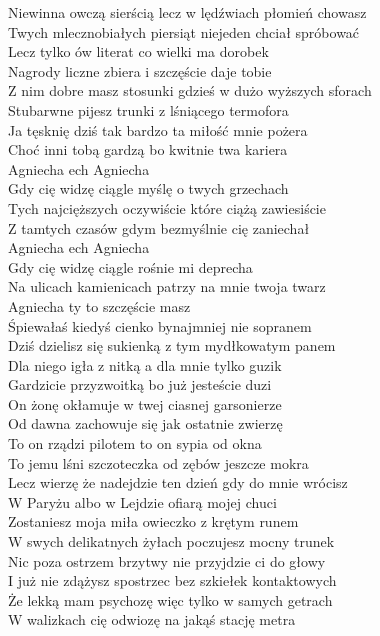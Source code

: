 \begin{text}

    Niewinna owczą sierścią lecz w lędźwiach płomień chowasz\\
    Twych mlecznobiałych piersiąt niejeden chciał spróbować\\
    Lecz tylko ów literat co wielki ma dorobek\\
    Nagrody liczne zbiera i szczęście daje tobie\\
    Z nim dobre masz stosunki gdzieś w dużo wyższych sforach\\
    Stubarwne pijesz trunki z lśniącego termofora\\
    Ja tęsknię dziś tak bardzo ta miłość mnie pożera\\
    Choć inni tobą gardzą bo kwitnie twa kariera\\
    Agniecha ech Agniecha\\
    Gdy cię widzę ciągle myślę o twych grzechach\\
    Tych najcięższych oczywiście które ciążą zawiesiście\\
    Z tamtych czasów gdym bezmyślnie cię zaniechał\\
    Agniecha ech Agniecha\\
    Gdy cię widzę ciągle rośnie mi deprecha\\
    Na ulicach kamienicach patrzy na mnie twoja twarz\\
    Agniecha ty to szczęście masz\\
    Śpiewałaś kiedyś cienko bynajmniej nie sopranem\\
    Dziś dzielisz się sukienką z tym mydłkowatym panem\\
    Dla niego igła z nitką a dla mnie tylko guzik\\
    Gardzicie przyzwoitką bo już jesteście duzi\\
    On żonę okłamuje w twej ciasnej garsonierze\\
    Od dawna zachowuje się jak ostatnie zwierzę\\
    To on rządzi pilotem to on sypia od okna\\
    To jemu lśni szczoteczka od zębów jeszcze mokra\\
    Lecz wierzę że nadejdzie ten dzień gdy do mnie wrócisz\\
    W Paryżu albo w Lejdzie ofiarą mojej chuci\\
    Zostaniesz moja miła owieczko z krętym runem\\
    W swych delikatnych żyłach poczujesz mocny trunek\\
    Nic poza ostrzem brzytwy nie przyjdzie ci do głowy\\
    I już nie zdążysz spostrzec bez szkiełek kontaktowych\\
    Że lekką mam psychozę więc tylko w samych getrach\\
    W walizkach cię odwiozę na jakąś stację metra
    
\end{text}
\begin{chord}

\end{chord}